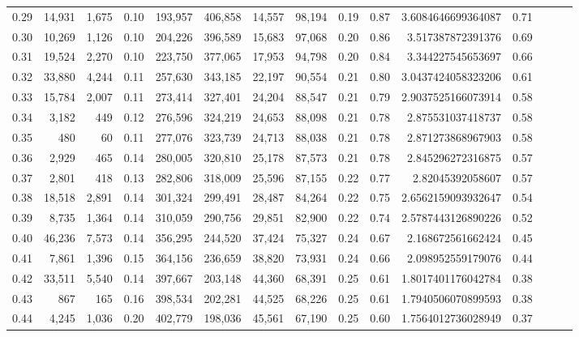 \begin{tabular}{rrrrrrrrrrrrrrr}
0.29 &  14,931 &  1,675 &  0.10 &  193,957 &  406,858 &   14,557 &   98,194 &  0.19 &  0.87 &    3.6084646699364087 &      0.71 \\
0.30 &  10,269 &  1,126 &  0.10 &  204,226 &  396,589 &   15,683 &   97,068 &  0.20 &  0.86 &     3.517387872391376 &      0.69 \\
0.31 &  19,524 &  2,270 &  0.10 &  223,750 &  377,065 &   17,953 &   94,798 &  0.20 &  0.84 &     3.344227545653697 &      0.66 \\
0.32 &  33,880 &  4,244 &  0.11 &  257,630 &  343,185 &   22,197 &   90,554 &  0.21 &  0.80 &    3.0437424058323206 &      0.61 \\
0.33 &  15,784 &  2,007 &  0.11 &  273,414 &  327,401 &   24,204 &   88,547 &  0.21 &  0.79 &    2.9037525166073914 &      0.58 \\
0.34 &   3,182 &    449 &  0.12 &  276,596 &  324,219 &   24,653 &   88,098 &  0.21 &  0.78 &     2.875531037418737 &      0.58 \\
0.35 &     480 &     60 &  0.11 &  277,076 &  323,739 &   24,713 &   88,038 &  0.21 &  0.78 &     2.871273868967903 &      0.58 \\
0.36 &   2,929 &    465 &  0.14 &  280,005 &  320,810 &   25,178 &   87,573 &  0.21 &  0.78 &     2.845296272316875 &      0.57 \\
0.37 &   2,801 &    418 &  0.13 &  282,806 &  318,009 &   25,596 &   87,155 &  0.22 &  0.77 &      2.82045392058607 &      0.57 \\
0.38 &  18,518 &  2,891 &  0.14 &  301,324 &  299,491 &   28,487 &   84,264 &  0.22 &  0.75 &    2.6562159093932647 &      0.54 \\
0.39 &   8,735 &  1,364 &  0.14 &  310,059 &  290,756 &   29,851 &   82,900 &  0.22 &  0.74 &    2.5787443126890226 &      0.52 \\
0.40 &  46,236 &  7,573 &  0.14 &  356,295 &  244,520 &   37,424 &   75,327 &  0.24 &  0.67 &     2.168672561662424 &      0.45 \\
0.41 &   7,861 &  1,396 &  0.15 &  364,156 &  236,659 &   38,820 &   73,931 &  0.24 &  0.66 &     2.098952559179076 &      0.44 \\
0.42 &  33,511 &  5,540 &  0.14 &  397,667 &  203,148 &   44,360 &   68,391 &  0.25 &  0.61 &    1.8017401176042784 &      0.38 \\
0.43 &     867 &    165 &  0.16 &  398,534 &  202,281 &   44,525 &   68,226 &  0.25 &  0.61 &    1.7940506070899593 &      0.38 \\
0.44 &   4,245 &  1,036 &  0.20 &  402,779 &  198,036 &   45,561 &   67,190 &  0.25 &  0.60 &    1.7564012736028949 &      0.37 \\

\end{tabular}
